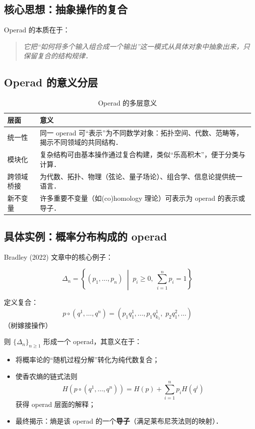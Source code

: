 \documentclass[10pt, openany]{book}
\begin{document}
\subsection{核心思想：抽象操作的复合}

Operad 的本质在于：
\begin{quote}
    \textit{它把“如何将多个输入组合成一个输出”这一模式从具体对象中抽象出来，只保留复合的结构规律．}
\end{quote}

\subsection{Operad 的意义分层}

\begin{table}[h]
\centering
\begin{tabular}{|p{3cm}|p{10cm}|}
\hline
\textbf{层面} & \textbf{意义} \\
\hline
统一性 & 同一 operad 可“表示”为不同数学对象：拓扑空间、代数、范畴等，揭示不同领域的共同结构． \\
\hline
模块化 & 复杂结构可由基本操作通过复合构建，类似“乐高积木”，便于分类与计算． \\
\hline
跨领域桥接 & 为代数、拓扑、物理（弦论、量子场论）、组合学、信息论提供统一语言． \\
\hline
新不变量 & 许多重要不变量（如(co)homology 理论）可表示为 operad 的表示或导子． \\
\hline
\end{tabular}
\caption{Operad 的多层意义}
\end{table}

\subsection{具体实例：概率分布构成的 operad}

Bradley (2022) 文章中的核心例子：

\[
\Delta_n = \left\{ (p_1,\dots,p_n) \;\middle|\; p_i \geq 0,\; \sum_{i=1}^n p_i = 1 \right\}
\]

定义复合：
\[
p \circ (q^1,\dots,q^n) = \left( p_1 q^1_1, \dots, p_1 q^1_{k_1},\; p_2 q^2_1, \dots \right)
\]
（树嫁接操作）

则 \(\{\Delta_n\}_{n\geq 1}\) 形成一个 operad，其意义在于：
\begin{itemize}
    \item 将概率论的“随机过程分解”转化为纯代数复合；
    \item 使香农熵的链式法则
    \[
    H(p\circ(q^1,\dots,q^n)) = H(p) + \sum_{i=1}^n p_i H(q^i)
    \]
    获得 operad 层面的解释；
    \item 最终揭示：熵是该 operad 的一个\textbf{导子}（满足莱布尼茨法则的映射）．
\end{itemize}
\end{document}
